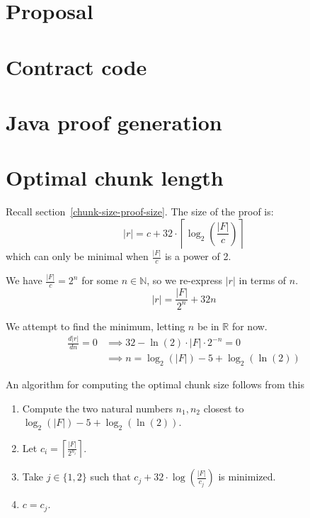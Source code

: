 \documentclass[10pt,twoside,a4paper]{article}
\begin{document}
\begin{appendices}

\section{Proposal}



\section{Contract code} \label{app-contract}

\section{Java proof generation} \label{app-java}

\section{Optimal chunk length} \label{app-chunk-size}

Recall section~\ref{chunk-size-proof-size}.
The size of the proof is:
\[|r| = c + 32 \cdot \left\lceil\log_2\left(\frac{|F|}{c}\right)\right\rceil\]
which can only be minimal when $\frac{|F|}{c}$ is a power of 2.

We have $\frac{|F|}{c} = 2^n$ for some $n \in \mathbb{N}$, so we re-express $|r|$ in terms of $n$.
\[|r| = \frac{|F|}{2^n} + 32 n\]

We attempt to find the minimum, letting $n$ be in $\mathbb{R}$ for now.
\begin{align*}
\frac{d |r|}{d n} = 0 &\implies 32 - \ln(2) \cdot |F| \cdot 2^{-n} = 0\\
&\implies n = \log_2(|F|) - 5 + \log_2(\ln(2))
\end{align*}

An algorithm for computing the optimal chunk size follows from this
\begin{enumerate}
\item Compute the two natural numbers $n_1, n_2$ closest to $\log_2(|F|) - 5 + \log_2(\ln(2))$.
\item Let $c_i = \left\lceil \frac{|F|}{2^{n_i}}\right\rceil$.
\item Take $j \in \{1, 2\}$ such that $c_j + 32 \cdot \log\left(\frac{|F|}{c_j}\right)$ is minimized.
\item $c = c_j$.
\end{enumerate}
\end{appendices}
\end{document}
